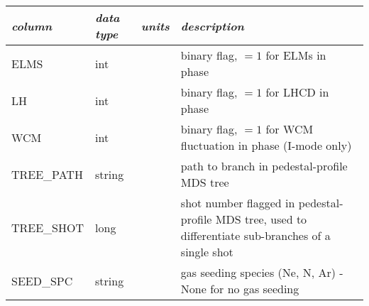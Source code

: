 \begin{table*}[h]
 \pushtooutside
 {\begin{tabu} to 143mm {X[2.348,l]X[1,c]X[1,c]X[4.348,c]}
   \toprule
   \emph{column} &
   \emph{data type} &
   \emph{units} &
   \emph{description}
   \\
   \midrule
   ELMS &
   int &
   &
   binary flag, $=1$ for ELMs in phase
   \\
   LH &
   int &
   &
   binary flag, $=1$ for LHCD in phase
   \\
   WCM &
   int &
   &
   binary flag, $=1$ for WCM fluctuation in phase (I-mode only)
   \\
   TREE\_PATH &
   string &
   &
   path to branch in pedestal-profile MDS tree
   \\
   TREE\_SHOT &
   long &
   &
   shot number flagged in pedestal-profile MDS tree, used to differentiate sub-branches of a single shot
   \\
   SEED\_SPC &
   string &
   &
   gas seeding species (Ne, N, Ar) - None for no gas seeding
   \\
   \bottomrule
  \end{tabu}}
\end{table*}


